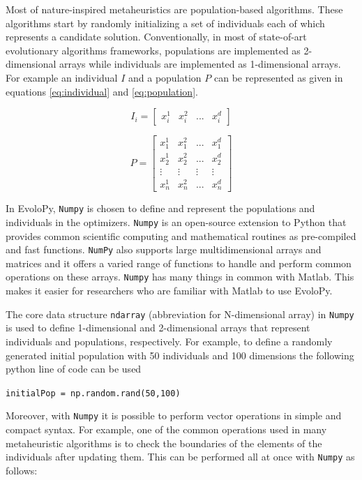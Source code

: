 \documentclass[a4paper,twoside]{article}
\begin{document}
Most of nature-inspired metaheuristics are population-based algorithms. These algorithms start by randomly initializing a set of individuals each of which represents a candidate solution. Conventionally, in most of state-of-art evolutionary algorithms frameworks, populations are implemented as 2-dimensional arrays while individuals are implemented as 1-dimensional arrays. For example an individual $I$ and a population $P$ can be represented as given in equations \ref{eq:individual} and \ref{eq:population}.

\begin{equation}
I_{i}=[\begin{array}{cccc}
x_{i}^{1} & x_{i}^{2} & ... & x_{i}^{d}\end{array}]
\label{eq:individual}
\end{equation}

\begin{equation}
P=\left[\begin{array}{cccc}
x_{1}^{1} & x_{1}^{2} & ... & x_{1}^{d}\\
x_{2}^{1} & x_{2}^{2} & ... & x_{2}^{d}\\
\vdots & \vdots & \vdots & \vdots\\
x_{n}^{1} & x_{n}^{2} & ... & x_{n}^{d}
\end{array}\right]
\label{eq:population}
\end{equation}

In EvoloPy, \texttt{Numpy} is chosen to define and represent the populations and individuals in the optimizers. \texttt{Numpy} is an open-source extension to Python that provides common scientific computing and mathematical routines as pre-compiled and fast functions. \texttt{NumPy} also supports large multidimensional arrays and matrices and it offers a varied range of functions to handle and perform common operations on these arrays. \texttt{Numpy} has many things in common with Matlab. This makes it easier for researchers who are familiar with Matlab to use EvoloPy. 

The core data structure \texttt{ndarray} (abbreviation for N-dimensional array) in \texttt{Numpy} is used to define 1-dimensional and 2-dimensional arrays that represent individuals and populations, respectively. For example, to define a randomly generated initial population with 50 individuals and 100 dimensions the following python line of code can be used

\texttt{initialPop = np.random.rand(50,100)}


Moreover, with \texttt{Numpy} it is possible to perform vector operations in simple and compact syntax. For example, one of the common operations used in many metaheuristic algorithms is to check the boundaries of the elements of the individuals after updating them. This can be performed all at once with \texttt{Numpy} as follows:
\end{document}
